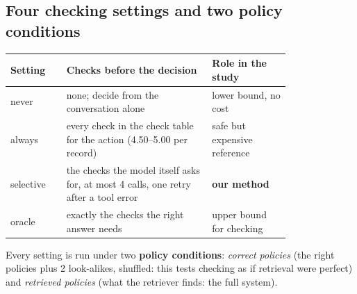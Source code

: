 \documentclass[10pt]{article}
\begin{document}
\subsection{Four checking settings and two policy conditions}
\begin{center}\small
\begin{tabular}{@{}lL{0.52\linewidth}L{0.28\linewidth}@{}}
\toprule
\textbf{Setting} & \textbf{Checks before the decision} & \textbf{Role in the study}\\
\midrule
never & none; decide from the conversation alone & lower bound, no cost\\
always & every check in the check table for the action (4.50--5.00 per record) & safe but expensive reference\\
selective & the checks the model itself asks for, at most 4 calls, one retry after a tool error & \textbf{our method}\\
oracle & exactly the checks the right answer needs & upper bound for checking\\
\bottomrule
\end{tabular}
\end{center}
Every setting is run under two \textbf{policy conditions}: \emph{correct policies} (the right policies plus 2
look-alikes, shuffled: this tests checking as if retrieval were perfect) and \emph{retrieved policies} (what
the retriever finds: the full system).
\end{document}
